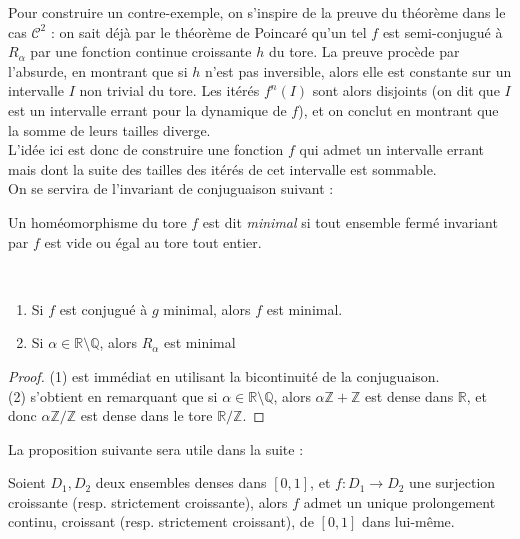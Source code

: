 \documentclass[11pt,a4paper]{article}
\begin{document}
Pour construire un contre-exemple, on s'inspire de la preuve du théorème dans le cas $\mathcal{C}^2$ : on sait déjà par le théorème de Poincaré qu'un tel $f$ est semi-conjugué à $R_\alpha$ par une fonction continue croissante $h$ du tore. La preuve procède par l'absurde, en montrant que si $h$ n'est pas inversible, alors elle est constante sur un intervalle $I$ non trivial du tore. Les itérés $f^n(I)$ sont alors disjoints (on dit que $I$ est un intervalle errant pour la dynamique de $f$), et on conclut en montrant que la somme de leurs tailles diverge. \\ 
L'idée ici est donc de construire une fonction $f$ qui admet un intervalle errant mais dont la suite des tailles des itérés de cet intervalle est sommable. \\

On se servira de l'invariant de conjuguaison suivant : 

\begin{defin} 
Un homéomorphisme du tore $f$ est dit \textit{minimal} si tout ensemble fermé invariant par  $f$ est vide ou égal au tore tout entier. 
\end{defin}


\begin{prop}\label{minimal} ~
\begin{enumerate}
\item Si $f$ est conjugué à $g$ minimal, alors $f$ est minimal.
\item Si $\alpha \in \mathbb{R} \setminus \mathbb{Q}$, alors $R_\alpha$ est minimal
\end{enumerate}
\end{prop}

\begin{proof}
(1) est immédiat en utilisant la bicontinuité de la conjuguaison. \\
(2) s'obtient en remarquant que si $\alpha \in \mathbb{R} \setminus \mathbb{Q}$, alors $\alpha\mathbb{Z} + \mathbb{Z}$ est dense dans $\mathbb{R}$, et donc $\alpha\mathbb{Z}/\mathbb{Z}$ est dense dans le tore $\mathbb{R}/\mathbb{Z}$. 
\end{proof}

La proposition suivante sera utile dans la suite :


\begin{prop}\label{dense}
Soient $D_1,D_2$ deux ensembles denses dans $[0,1]$, et $f : D_1 \to D_2$ une surjection croissante (resp. strictement croissante), alors $f$ admet un unique prolongement continu, croissant (resp. strictement croissant), de $[0,1]$ dans lui-même.
\end{prop}
\end{document}
